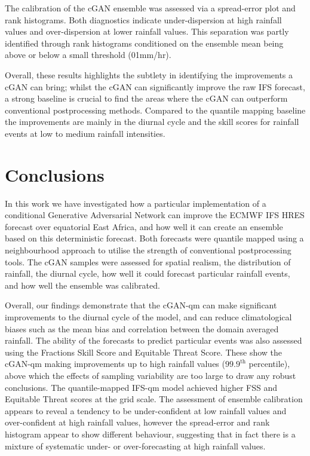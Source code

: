 \documentclass{article}
\begin{document}
The calibration of the cGAN ensemble was assessed via a spread-error plot and rank histograms. Both diagnostics indicate under-dispersion at high rainfall values and over-dispersion at lower rainfall values. This separation was partly identified through rank histograms conditioned on the ensemble mean being above or below a small threshold (01mm/hr).

Overall, these results highlights the subtlety in identifying the improvements a cGAN can bring; whilst the cGAN can significantly improve the raw IFS forecast, a strong baseline is crucial to find the areas where the cGAN can outperform conventional postprocessing methods. Compared to the quantile mapping baseline the improvements are mainly in the diurnal cycle and the skill scores for rainfall events at low to medium rainfall intensities. 

\section{ Conclusions}



In this work we have investigated how a particular implementation of a conditional Generative Adversarial Network can improve the ECMWF IFS HRES forecast over equatorial East Africa, and how well it can create an ensemble based on this deterministic forecast. Both forecasts were quantile mapped using a neighbourhood approach to utilise the strength of conventional postprocessing tools. The cGAN samples were assessed for spatial realism, the distribution of rainfall, the diurnal cycle, how well it could forecast particular rainfall events, and how well the ensemble was calibrated.

Overall, our findings demonstrate that the 
cGAN-qm can make significant improvements to the diurnal cycle of the model, and can reduce climatological biases such as the mean bias and correlation between the domain averaged rainfall. The ability of the forecasts to predict particular events was also assessed using the Fractions Skill Score and Equitable Threat Score. These show the cGAN-qm making improvements up to high rainfall values ($99.9^{\text{th}}$ percentile), above which the effects of sampling variability are too large to draw any robust conclusions. The quantile-mapped IFS-qm model achieved higher FSS and Equitable Threat scores at the grid scale. The assessment of ensemble calibration appears to reveal a tendency to be under-confident at low rainfall values and over-confident at high rainfall values, however the spread-error and rank histogram appear to show different behaviour, suggesting that in fact there is a mixture of systematic under- or over-forecasting at high rainfall values.
\end{document}
